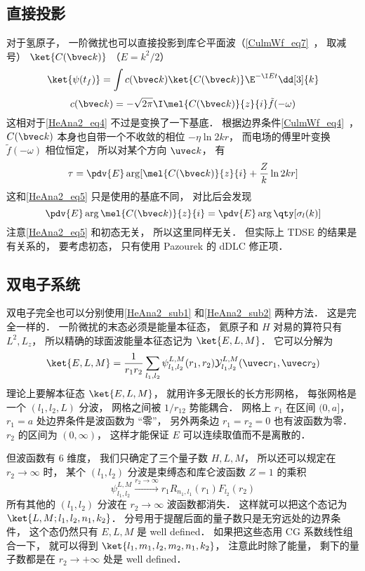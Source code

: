 \subsection{直接投影}\label{HeAna2_sub2}
对于氢原子， 一阶微扰也可以直接投影到库仑平面波（\autoref{CulmWf_eq7}~， 取减号） $\ket{C(\bvec k)}$ （$E = k^2/2$）
\begin{equation}
\ket{\psi(t_f)} = \int c(\bvec k)\ket{C(\bvec k)} \E^{-\I E t} \dd[3]{k}
\end{equation}
\begin{equation}
c(\bvec k) = -\sqrt{2\pi}\I\mel{C(\bvec k)}{z}{i} \tilde f(-\omega)
\end{equation}
这相对于\autoref{HeAna2_eq4} 不过是变换了一下基底． 根据边界条件\autoref{CulmWf_eq4}~， $C(\bvec k)$ 本身也自带一个不收敛的相位 $-\eta \ln 2kr$， 而电场的傅里叶变换 $\tilde f(-\omega)$ 相位恒定， 所以对某个方向 $\uvec k$， 有
\begin{equation}
\tau = \pdv{E} \arg[\mel{C(\bvec k)}{z}{i} + \frac{Z}{k}\ln 2kr]
\end{equation}
这和\autoref{HeAna2_eq5} 只是使用的基底不同， 对比后会发现
\begin{equation}
\pdv{E} \arg\mel{C(\bvec k)}{z}{i} = \pdv{E} \arg\qty[\sigma_l(k)]
\end{equation}
注意\autoref{HeAna2_eq5} 和初态无关， 所以这里同样无关． 但实际上 TDSE 的结果是有关系的， 要考虑初态， 只有使用 Pazourek 的 dDLC 修正项．

\subsection{双电子系统}
双电子完全也可以分别使用\autoref{HeAna2_sub1} 和\autoref{HeAna2_sub2} 两种方法． 这是完全一样的． 一阶微扰的末态必须是能量本征态， 氦原子和 $H$ 对易的算符只有 $L^2, L_z$， 所以精确的球面波能量本征态记为 $\ket{E,L,M}$． 它可以分解为
\begin{equation}
\ket{E,L,M} = \frac{1}{r_1r_2}\sum_{l_1,l_2}\psi_{l_1,l_2}^{L, M}(r_1, r_2)\mathcal Y_{l_1,l_2}^{L, M}(\uvec r_1, \uvec r_2)
\end{equation}
理论上要解本征态 $\ket{E,L,M}$， 就用许多无限长的长方形网格， 每张网格是一个 $(l_1,l_2,L)$ 分波， 网格之间被 $1/r_{12}$ 势能耦合． 网格上 $r_1$ 在区间 $(0,a]$， $r_1 = a$ 处边界条件是波函数为 “零”， 另外两条边 $r_1 = r_2 = 0$ 也有波函数为零． $r_2$ 的区间为 $(0,\infty)$， 这样才能保证 $E$ 可以连续取值而不是离散的．

但波函数有 6 维度， 我们只确定了三个量子数 $H,L,M$， 所以还可以规定在 $r_2\to\infty$ 时， 某个 $(l_1,l_2)$ 分波是束缚态和库仑波函数 $Z=1$ 的乘积
\begin{equation}
\psi_{l_1,l_2}^{L, M} \overset{r_2\to\infty}{\longrightarrow} r_1 R_{n_1,l_1}(r_1) F_{l_2}(r_2)
\end{equation}
所有其他的 $(l_1,l_2)$ 分波在 $r_2\to\infty$ 波函数都消失． 这样就可以把这个态记为 $\ket{L,M; l_1,l_2, n_1, k_2}$． 分号用于提醒后面的量子数只是无穷远处的边界条件， 这个态仍然只有 $E,L,M$ 是 well defined． 如果把这些态用 CG 系数线性组合一下， 就可以得到 $\ket{l_1, m_1, l_2,m_2,n_1,k_2}$， 注意此时除了能量， 剩下的量子数都是在 $r_2\to+\infty$ 处是 well defined．

